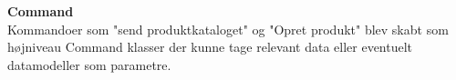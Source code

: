 \textbf{Command}\\
Kommandoer som "send produktkataloget" og "Opret produkt" blev skabt som højniveau Command klasser der kunne tage relevant data eller eventuelt datamodeller som parametre. \\\\